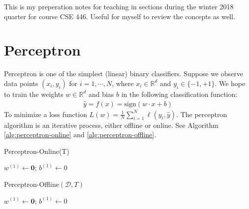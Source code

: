 \documentclass[12pt]{article}
\title{}
\begin{document}
\pagestyle{fancy}
\fancyhf{} %
\cfoot{\thepage}
\renewcommand{\headrulewidth}{1pt}

This is my preperation notes for teaching in sections during the winter 2018 quarter for course CSE 446. Useful for myself to review the concepts as well.

\section{Perceptron}

Perceptron is one of the simplest (linear) binary classifiers. Suppose we observe data points $(x_i, y_i)$ for $i=1,\cdots,N$, where $x_i\in\mathbb{R}^d$ and $y_i\in\{-1,+1\}$. We hope to train the weights $w\in\mathbb{R}^d$ and bias $b$ in the following classification function:
\begin{align}
\hat{y}=f(x)=\text{sign}(w\cdot x+b)
\end{align}
To minimize a loss function $L(w) = \frac{1}{N}\sum_{i=1}^N\ell(y_i, \hat{y})$. The perceptron algorithm is an iterative process, either offline or online. See Algorithm \ref{alg:perceptron-online} and \ref{alg:perceptron-offline}.


\begin{algorithm}[h]
    \caption{Perceptron-Online(T)}
    \label{alg:perceptron-online}
    $w^{(1)}\gets \bm{0}$; $b^{(1)}\gets 0$\;
\end{algorithm}

\begin{algorithm}[h]
    \caption{Perceptron-Offline$(\mathcal{D},T)$}
    \label{alg:perceptron-offline}
    $w^{(1)}\gets \bm{0}$; $b^{(1)}\gets 0$\;
\end{algorithm}
\end{document}
